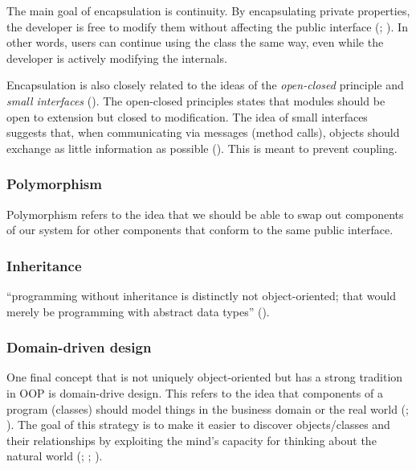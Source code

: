 \documentclass[
]{book}
\theoremstyle{definition}
\theoremstyle{definition}
\theoremstyle{definition}
\theoremstyle{definition}
\theoremstyle{remark}
\begin{document}
The main goal of encapsulation is continuity. By encapsulating private properties, the developer is free to modify them without affecting the public interface (; ). In other words, users can continue using the class the same way, even while the developer is actively modifying the internals.

Encapsulation is also closely related to the ideas of the \emph{open-closed} principle and \emph{small interfaces} (). The open-closed principles states that modules should be open to extension but closed to modification. The idea of small interfaces suggests that, when communicating via messages (method calls), objects should exchange as little information as possible (). This is meant to prevent coupling.

\subsubsection{Polymorphism}\label{polymorphism}

Polymorphism refers to the idea that we should be able to swap out components of our system for other components that conform to the same public interface.

\subsubsection{Inheritance}\label{inheritance}

``programming without inheritance is distinctly not object-oriented; that would merely be programming with abstract data types'' ().

\subsubsection{Domain-driven design}\label{domain-driven-design}

One final concept that is not uniquely object-oriented but has a strong tradition in OOP is domain-drive design. This refers to the idea that components of a program (classes) should model things in the business domain or the real world (; ). The goal of this strategy is to make it easier to discover objects/classes and their relationships by exploiting the mind's capacity for thinking about the natural world (; ; ).
\end{document}
